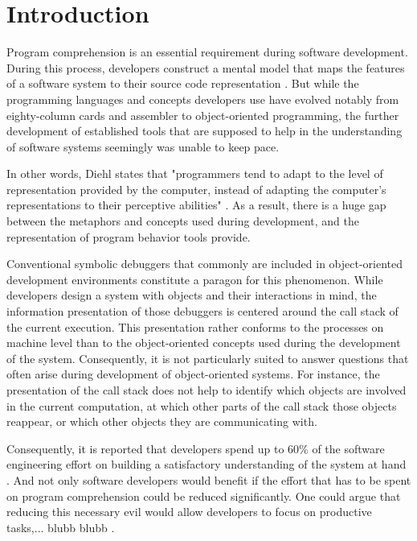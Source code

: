 \chapter{Introduction}
\label{c:introduction}

Program comprehension is an essential requirement during software development.
During this process, developers construct a mental model that maps the features of a software system to their source code representation \cite{latoza_maintaining_2006}.
But while the programming languages and concepts developers use have evolved notably from eighty-column cards and assembler to object-oriented programming, the further development of established tools that are supposed to help in the understanding of software systems seemingly was unable to keep pace.

In other words, Diehl states that "programmers tend to adapt to the level of representation provided by the computer, instead of adapting the computer's representations to their perceptive abilities" \cite{diehl_software_2007}.
As a result, there is a huge gap between the metaphors and concepts used during development, and the representation of program behavior tools provide.

Conventional symbolic debuggers that commonly are included in object-oriented development environments constitute a paragon for this phenomenon.
While developers design a system with objects and their interactions in mind, the information presentation of those debuggers is centered around the call stack of the current execution.
This presentation rather conforms to the processes on machine level than to the object-oriented concepts used during the development of the system.
Consequently, it is not particularly suited to answer questions that often arise during development of object-oriented systems.
For instance, the presentation of the call stack does not help to identify which objects are involved in the current computation, at which other parts of the call stack those objects reappear, or which other objects they are communicating with.

Consequently, it is reported that developers spend up to 60\% of the software engineering effort on building a satisfactory understanding of the system at hand \cite{corbi_program_1989, basili_evolving_1997, ducasse_class_2005, rothlisberger_feature_2007, cornelissen_execution_2008}.
And not only software developers would benefit if the effort that has to be spent on program comprehension could be reduced significantly.
One could argue that reducing this necessary evil would allow developers to focus on productive tasks,... blubb blubb .

